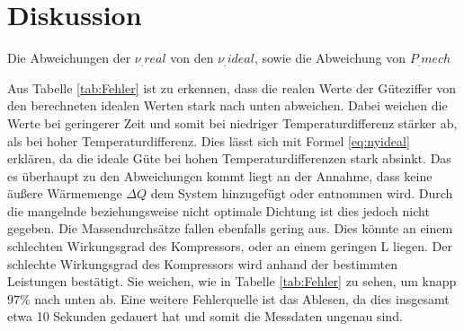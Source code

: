 
\section{Diskussion}
\label{sec:Diskussion}
\begin{table}
	\centering
	\caption{Die Abweichungen der $\nu_.{real}$ von den $\nu_.{ideal}$, sowie die Abweichung von $P_.{mech}$}
	
	\label{tab:Fehler}
\end{table}
\noindent Aus Tabelle \ref{tab:Fehler} ist zu erkennen, dass die realen Werte der Güteziffer von den berechneten idealen Werten stark nach unten abweichen. Dabei weichen die Werte bei geringerer Zeit und somit bei niedriger Temperaturdifferenz stärker ab, als bei hoher Temperaturdifferenz. Dies lässt sich mit Formel \eqref{eq:nyideal} erklären, da die ideale Güte bei hohen Temperaturdifferenzen stark absinkt. Das es überhaupt zu den Abweichungen kommt liegt an der Annahme, dass keine äußere Wärmemenge $\Delta Q$ dem System hinzugefügt oder entnommen wird. Durch die mangelnde beziehungsweise nicht optimale Dichtung ist dies jedoch nicht gegeben. Die Massendurchsätze fallen ebenfalls gering aus. Dies könnte an einem schlechten Wirkungsgrad des Kompressors, oder an einem geringen L liegen.
Der schlechte Wirkungsgrad des Kompressors wird anhand der bestimmten Leistungen bestätigt. Sie weichen, wie in Tabelle \ref{tab:Fehler} zu sehen, um knapp $97\%$ nach unten ab. Eine weitere Fehlerquelle ist das Ablesen, da dies insgesamt etwa 10 Sekunden gedauert hat und somit die Messdaten ungenau sind. 